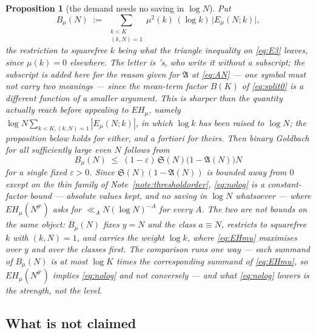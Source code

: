 \documentclass[11pt,a4paper]{article}
\theoremstyle{plain}
\newtheorem{proposition}[theorem]{Proposition}
\theoremstyle{definition}
\theoremstyle{remark}
\renewcommand{\SS}{\mathfrak{S}}
\newcommand{\AAA}{\mathfrak{A}}
\newcommand{\Emu}{E_\mu}
\begin{document}
\begin{proposition}[the demand needs no saving in $\log N$]%
\label{prop:nolog}
Put
\begin{equation}\label{eq:Bsum}
  B_\mu(N)\;:=\;\sum_{\substack{k<K\\ (k,N)=1}}
     \mu^2(k)\,(\log k)\,\bigl|\Emu(N;k)\bigr|,
\end{equation}
the restriction to squarefree $k$ being what the triangle inequality
on \eqref{eq:E3} leaves, since $\mu(k)=0$ elsewhere. The letter is
\cite{HL}'s, who write it without a subscript; the subscript is added
here for the reason given for $\AAA$ at \eqref{eq:AN} --- one symbol
must not carry two meanings --- since the mean-term factor $B(K)$ of
\eqref{eq:split0} is a different function of a smaller argument. This is
sharper than the quantity \cite{HL} actually reach before appealing to
$EH_\mu$, namely
$\log N\sum_{k<K,(k,N)=1}|\Emu(N;k)|$, in which $\log k$ has been
raised to $\log N$; the proposition below holds for either, and a
fortiori for theirs. Then binary Goldbach for all sufficiently large
even $N$ follows from
\begin{equation}\label{eq:nolog}
  B_\mu(N)\;\le\;(1-\varepsilon)\,\SS(N)\bigl(1-\AAA(N)\bigr)N
\end{equation}
for a single fixed $\varepsilon>0$. Since $\SS(N)(1-\AAA(N))$ is
bounded away from $0$ except on the thin family of
Note~\ref{note:thresholdorder}, \eqref{eq:nolog} is a
\emph{constant-factor}
bound --- absolute values kept, and no saving in $\log N$ whatsoever
--- where $EH_\mu(N^{\theta'})$ asks for $\ll_A N(\log N)^{-A}$ for
every $A$. The two are not bounds on the same object: $B_\mu(N)$ fixes
$y=N$ and the class $a\equiv N$, restricts to squarefree $k$ with
$(k,N)=1$, and carries the weight $\log k$, where \eqref{eq:EHmu}
maximises over $y$ and over the classes first. The comparison runs one
way --- each summand of $B_\mu(N)$ is at most $\log K$ times the
corresponding summand of \eqref{eq:EHmu}, so $EH_\mu(N^{\theta'})$
implies \eqref{eq:nolog} and not conversely --- and what
\eqref{eq:nolog} lowers is the strength, not the level.
\end{proposition}

\subsection{What is not claimed}\label{sec:notclaimed}
\end{document}
